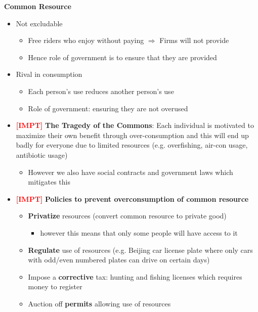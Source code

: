 \documentclass{article}
\newcommand{\impt}[0]{\textcolor{red}{\textbf{[IMPT] }}}
\begin{document}
\begin{multicols}{2}
\begin{itemize}
\end{itemize}
\textbf{Common Resource}
\begin{itemize}
	\item Not excludable
	\begin{itemize}
		\item Free riders who enjoy without paying $\Rightarrow$ Firms will not provide
		\item Hence role of government is to ensure that they are provided
	\end{itemize}
    \item Rival in consumption
    \begin{itemize}
    	\item Each person's use reduces another person's use
    	\item Role of government: ensuring they are not overused
    \end{itemize}
    \item \impt \textbf{The Tragedy of the Commons}: Each individual is motivated to maximize their own benefit through over-consumption and this will end up badly for everyone due to limited resources (e.g. overfishing, air-con usage, antibiotic usage)
    \begin{itemize}
    	\item However we also have social contracts and government laws which mitigates this
    \end{itemize}
    \item \impt \textbf{Policies to prevent overconsumption of common resource}
    \begin{itemize}
    	\item \textbf{Privatize} resources (convert common resource to private good)
    	\begin{itemize}
    		\item however this means that only some people will have access to it
    	\end{itemize}
        \item \textbf{Regulate} use of resources (e.g. Beijing car license plate where only cars with odd/even numbered plates can drive on certain days)
        \item Impose a \textbf{corrective} tax: hunting and fishing licenses which requires money to register
        \item Auction off \textbf{permits} allowing use of resources
    \end{itemize}
\end{itemize}

\end{multicols}
\end{document}
